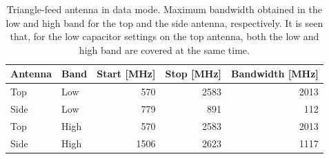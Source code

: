 \begin{table}[htbp]
    \centering
    \begin{tabular}{|l|l|r|r|r|}
        \hline
        Antenna & Band & Start [MHz] & Stop [MHz] & Bandwidth [MHz] \\
        \hline
        Top     & Low  & 570         & 2583       & 2013 \\
        Side    & Low  & 779         & 891        & 112  \\
        \hline
        Top     & High & 570         & 2583       & 2013 \\
        Side    & High & 1506        & 2623       & 1117 \\
        \hline
    \end{tabular}
    \caption{Triangle-feed antenna in data mode. Maximum bandwidth obtained in the low and high band for the top and the side antenna, respectively. It is seen that, for the low capacitor settings on the top antenna, both the low and high band are covered at the same time.}
    \label{tab:bw_sol2data}
\end{table}

